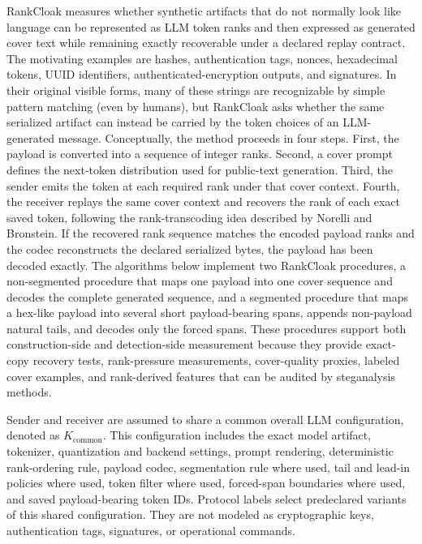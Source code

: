 \documentclass[fleqn,10pt]{wlscirep}
\begin{document}
RankCloak measures whether synthetic artifacts that do not normally look like language can be represented as LLM token ranks and then expressed as generated cover text while remaining exactly recoverable under a declared replay contract. The motivating examples are hashes, authentication tags, nonces, hexadecimal tokens, UUID identifiers, authenticated-encryption outputs, and signatures. In their original visible forms, many of these strings are recognizable by simple pattern matching (even by humans), but RankCloak asks whether the same serialized artifact can instead be carried by the token choices of an LLM-generated message. Conceptually, the method proceeds in four steps. First, the payload is converted into a sequence of integer ranks. Second, a cover prompt defines the next-token distribution used for public-text generation. Third, the sender emits the token at each required rank under that cover context. Fourth, the receiver replays the same cover context and recovers the rank of each exact saved token, following the rank-transcoding idea described by Norelli and Bronstein\cite{NorelliBronstein2026Calgacus}. If the recovered rank sequence matches the encoded payload ranks and the codec reconstructs the declared serialized bytes, the payload has been decoded exactly. The algorithms below implement two RankCloak procedures, a non-segmented procedure that maps one payload into one cover sequence and decodes the complete generated sequence, and a segmented procedure that maps a hex-like payload into several short payload-bearing spans, appends non-payload natural tails, and decodes only the forced spans. These procedures support both construction-side and detection-side measurement because they provide exact-copy recovery tests, rank-pressure measurements, cover-quality proxies, labeled cover examples, and rank-derived features that can be audited by steganalysis methods.

Sender and receiver are assumed to share a common overall LLM configuration, denoted as \(K_{\mathrm{common}}\). This configuration includes the exact model artifact, tokenizer, quantization and backend settings, prompt rendering, deterministic rank-ordering rule, payload codec, segmentation rule where used, tail and lead-in policies where used, token filter where used, forced-span boundaries where used, and saved payload-bearing token IDs. Protocol labels select predeclared variants of this shared configuration. They are not modeled as cryptographic keys, authentication tags, signatures, or operational commands.
\end{document}
